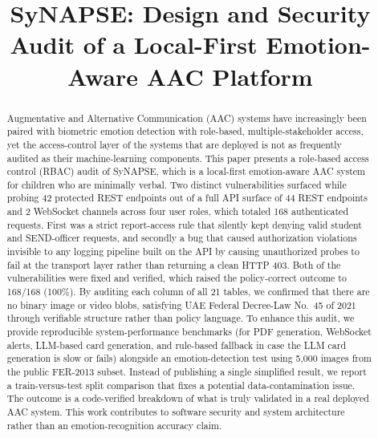 \documentclass[conference]{IEEEtran}
\begin{document}
\title{SyNAPSE: Design and Security Audit of a Local-First Emotion-Aware AAC Platform}

\author{
\and
{}
}


\maketitle

\begin{abstract}
Augmentative and Alternative Communication (AAC) systems have increasingly been paired with biometric emotion detection with role-based, multiple-stakeholder access, yet the access-control layer of the systems that are deployed is not as frequently audited as their machine-learning components. This paper presents a role-based access control (RBAC) audit of SyNAPSE, which is a local-first emotion-aware AAC system for children who are minimally verbal. Two distinct vulnerabilities surfaced while probing 42 protected REST endpoints out of a full API surface of 44 REST endpoints and 2 WebSocket channels across four user roles, which totaled 168 authenticated requests. First was a strict report-access rule that silently kept denying valid student and SEND-officer requests, and secondly a bug that caused authorization violations invisible to any logging pipeline built on the API by causing unauthorized probes to fail at the transport layer rather than returning a clean HTTP 403. Both of the vulnerabilities were fixed and verified, which raised the policy-correct outcome to 168/168 (100\%). By auditing each column of all 21 tables, we confirmed that there are no binary image or video blobs, satisfying UAE Federal Decree-Law No.~45 of 2021 through verifiable structure rather than policy language. To enhance this audit, we provide reproducible system-performance benchmarks (for PDF generation, WebSocket alerts, LLM-based card generation, and rule-based fallback in case the LLM card generation is slow or fails) alongside an emotion-detection test using 5{,}000 images from the public FER-2013 subset. Instead of publishing a single simplified result, we report a train-versus-test split comparison that fixes a potential data-contamination issue. The outcome is a code-verified breakdown of what is truly validated in a real deployed AAC system. This work contributes to software security and system architecture rather than an emotion-recognition accuracy claim.
\end{abstract}
\end{document}
